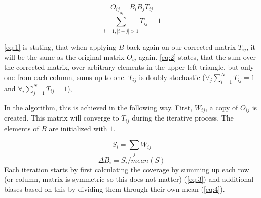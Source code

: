 \begin{equation} \label{eq:1}
O_{ij} = B_i B_j T_{ij}
\end{equation}
\begin{equation} \label{eq:2}
\sum^N_{i=1, |i-j|>1} T_{ij} = 1
\end{equation}


\eqref{eq:1} is stating, that when applying $B$ back again on our corrected
matrix $T_{ij}$, it will be the same as the original matrix $O_{ij}$ again.
\eqref{eq:2} states, that the sum over the corrected matrix, over arbitrary
elements in the upper left triangle, but only one from each column, sums up to
one. $T_{ij}$ is doubly stochastic ($\forall_j\sum^N_{i=1}T_{ij} = 1$ and
$\forall_i\sum^N_{j=1}T_{ij} = 1$), 


In the algorithm, this is achieved in the following way. First, $W_{ij}$, a
copy of $O_{ij}$ is created. This matrix will converge to $T_{ij}$ during the
iterative process. The elements of $B$ are initialized with $1$.


\begin{equation}\label{eq:3}
    S_i = \sum_j W_{ij}
\end{equation}
\begin{equation}\label{eq:4}
    \Delta B_i = S_i / mean(S)
\end{equation}
Each iteration starts by first calculating the coverage by summing up each row
(or column, matrix is symmetric so this does not matter) (\eqref{eq:3}) and
additional biases based on this by dividing them through their own mean
(\eqref{eq:4}).

